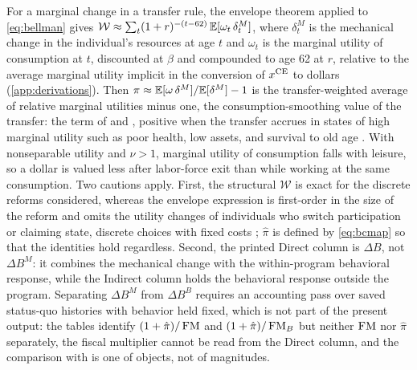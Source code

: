 For a marginal change in a transfer rule, the envelope theorem applied to \eqref{eq:bellman} gives $\mathcal{W}\approx\sum_{t}(1+r)^{-(t-62)}\,{\mathbb E}[\omega_t\,\delta^{M}_t]$, where $\delta^{M}_t$ is the mechanical change in the individual's resources at age $t$ and $\omega_t$ is the marginal utility of consumption at $t$, discounted at $\beta$ and compounded to age 62 at $r$, relative to the average marginal utility implicit in the conversion of $x^{\mathrm{CE}}$ to dollars (\autoref{app:derivations}). Then $\pi\approx{\mathbb E}[\omega\,\delta^{M}]/{\mathbb E}[\delta^{M}]-1$ is the transfer-weighted average of relative marginal utilities minus one, the consumption-smoothing value of the transfer: the term of \citet{baily1978some} and \citet{chetty2006general}, positive when the transfer accrues in states of high marginal utility such as poor health, low assets, and survival to old age \citep[see also][]{landais2021value,kolsrud2024retirement}. With nonseparable utility and $\nu>1$, marginal utility of consumption falls with leisure, so a dollar is valued less after labor-force exit than while working at the same consumption.
Two cautions apply. First, the structural $\mathcal{W}$ is exact for the discrete reforms considered, whereas the envelope expression is first-order in the size of the reform and omits the utility changes of individuals who switch participation or claiming state, discrete choices with fixed costs \citep{kleven2021sufficient}; $\hat\pi$ is defined by \eqref{eq:bcmap} so that the identities hold regardless. Second, the printed Direct column is $\Delta B$, not $\Delta B^{M}$: it combines the mechanical change with the within-program behavioral response, while the Indirect column holds the behavioral response outside the program. Separating $\Delta B^{M}$ from $\Delta B^{B}$ requires an accounting pass over saved status-quo histories with behavior held fixed, which is not part of the present output: the tables identify $(1+\hat\pi)/\operatorname{FM}$ and $(1+\hat\pi)/\operatorname{FM}_B$ but neither $\operatorname{FM}$ nor $\hat\pi$ separately, the fiscal multiplier cannot be read from the Direct column, and the comparison with \citet{haller2022welfare} is one of objects, not of magnitudes.

